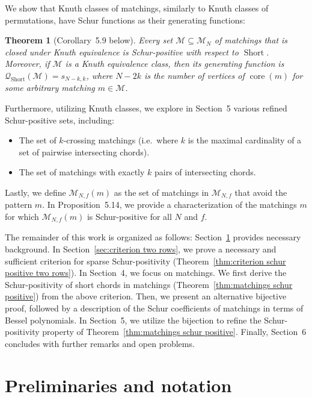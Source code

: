 \documentclass[11pt]{article}
\newtheorem{theorem}[theo]{Theorem}
\theoremstyle{definition}
\providecommand{\ie}{i.e.\ }
\numberwithin{equation}{section}
\newcommand{\Short}{\operatorname{Short}}
\newcommand{\core}{\operatorname{core}}
\newcommand{\Q}{\mathcal{Q}}
\newcommand{\M}{\mathcal{M}}
\begin{document}
We show that Knuth classes of matchings, similarly to Knuth classes of permutations, have Schur functions as their generating functions:

\begin{theorem}[Corollary~5.9 below]
    Every set $\M \subseteq \M_N$ of matchings that is closed under Knuth equivalence is Schur-positive with respect to $\Short$. Moreover, if $\M$ is a Knuth equivalence class, then its generating function is $\Q_{\Short}(\M) = s_{N-k,k}$, where $N-2k$ is the number of vertices of $\core(m)$ for some arbitrary matching $m \in \M$.
\end{theorem}

Furthermore, utilizing Knuth classes, we explore in Section~5 various refined Schur-positive sets, including:
\begin{itemize}
    \item The set of $k$-crossing matchings (\ie where $k$ is the maximal cardinality of a set of pairwise intersecting chords).
    \item The set of matchings with exactly $k$ pairs of intersecting chords.
\end{itemize}

Lastly, we define $\M_{N,f}(m)$ as the set of matchings in $\M_{N,f}$ that avoid the pattern $m$. In Proposition~5.14, we provide a characterization of the matchings $m$ for which $\M_{N,f}(m)$ is Schur-positive for all $N$ and $f$.

The remainder of this work is organized as follows: Section~\ref{sec:preliminaries} provides necessary background. In Section~\ref{sec:criterion two rows}, we prove a necessary and sufficient criterion for sparse Schur-positivity (Theorem~\ref{thm:criterion schur positive two rows}). In Section~4, we focus on matchings. We first derive the Schur-positivity of short chords in matchings (Theorem~\ref{thm:matchings schur positive}) from the above criterion. Then, we present an alternative bijective proof, followed by a description of the Schur coefficients of matchings in terms of Bessel polynomials. In Section~5, we utilize the bijection to refine the Schur-positivity property of Theorem~\ref{thm:matchings schur positive}. Finally, Section~6 concludes with further remarks and open problems.

\section{Preliminaries and notation}
\label{sec:preliminaries}
\end{document}
